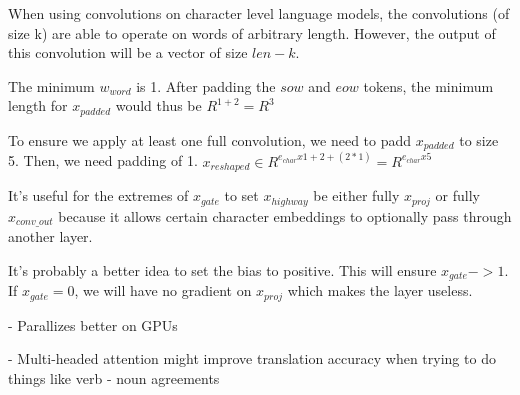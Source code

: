 \documentclass[11pt,largemargins]{homework}
\begin{document}
\maketitle

\question

When using convolutions on character level language models, the convolutions (of size k) are able to operate on words of arbitrary length. However, the output of this convolution will be a vector of size $len - k$. 

\question

The minimum $w_{word}$ is 1. After padding the $sow$ and $eow$ tokens,  the minimum length for $x_{padded}$ would thus be $R^{1+2} = R^{3}$

To ensure we apply at least one full convolution, we need to padd $x_{padded}$ to size 5. Then, we need padding of 1. $x_{reshaped} \in R^{e_{char} x 1 + 2 + (2 * 1)} =  R^{e_{char} x 5}$

\question
It's useful for the extremes of $x_{gate}$ to set $x_{highway}$ be either fully $x_{proj}$ or fully $x_{conv\_out}$ because it allows certain character embeddings to optionally pass through another layer. 

It's probably a better idea to set the bias to positive. This will ensure $x_{gate} -> 1$. If $x_{gate} = 0$, we will have no gradient on $x_{proj}$ which makes the layer useless. 

\question

- Parallizes better on GPUs

- Multi-headed attention might improve translation accuracy when trying to do things like verb - noun agreements 
 
\end{document}
